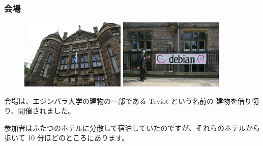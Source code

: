 \documentclass[mingoth,a4paper]{jsarticle}
\begin{document}
\subsubsection{会場}

\begin{figure}
  \includegraphics[width=5cm]{image200706/teviot.jpg}
  \includegraphics[width=5cm]{image200706/debconf7-debian.jpg}
\end{figure}
  会場は、エジンバラ大学の建物の一部である Teviot という名前の
  建物を借り切り、開催されました。

 参加者はふたつのホテルに分散して宿泊していたのですが、それらのホテルから歩いて
  10 分ほどのところにあります。
\\
\end{document}
